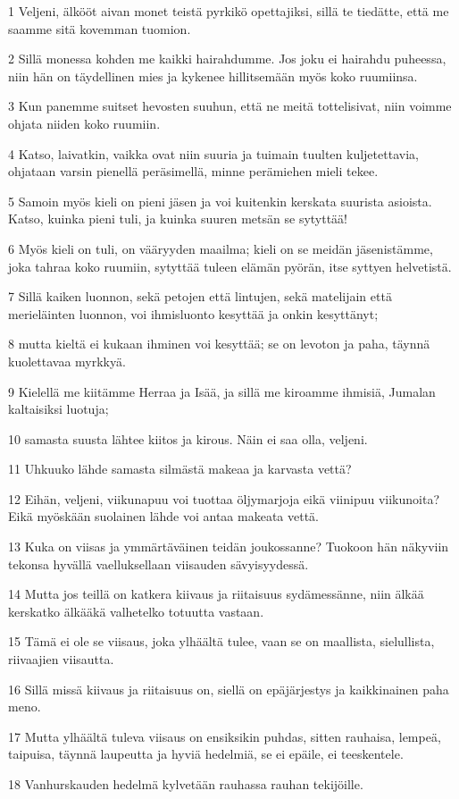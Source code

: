 \par 1 Veljeni, älkööt aivan monet teistä pyrkikö opettajiksi, sillä te tiedätte, että me saamme sitä kovemman tuomion.
\par 2 Sillä monessa kohden me kaikki hairahdumme. Jos joku ei hairahdu puheessa, niin hän on täydellinen mies ja kykenee hillitsemään myös koko ruumiinsa.
\par 3 Kun panemme suitset hevosten suuhun, että ne meitä tottelisivat, niin voimme ohjata niiden koko ruumiin.
\par 4 Katso, laivatkin, vaikka ovat niin suuria ja tuimain tuulten kuljetettavia, ohjataan varsin pienellä peräsimellä, minne perämiehen mieli tekee.
\par 5 Samoin myös kieli on pieni jäsen ja voi kuitenkin kerskata suurista asioista. Katso, kuinka pieni tuli, ja kuinka suuren metsän se sytyttää!
\par 6 Myös kieli on tuli, on vääryyden maailma; kieli on se meidän jäsenistämme, joka tahraa koko ruumiin, sytyttää tuleen elämän pyörän, itse syttyen helvetistä.
\par 7 Sillä kaiken luonnon, sekä petojen että lintujen, sekä matelijain että merieläinten luonnon, voi ihmisluonto kesyttää ja onkin kesyttänyt;
\par 8 mutta kieltä ei kukaan ihminen voi kesyttää; se on levoton ja paha, täynnä kuolettavaa myrkkyä.
\par 9 Kielellä me kiitämme Herraa ja Isää, ja sillä me kiroamme ihmisiä, Jumalan kaltaisiksi luotuja;
\par 10 samasta suusta lähtee kiitos ja kirous. Näin ei saa olla, veljeni.
\par 11 Uhkuuko lähde samasta silmästä makeaa ja karvasta vettä?
\par 12 Eihän, veljeni, viikunapuu voi tuottaa öljymarjoja eikä viinipuu viikunoita? Eikä myöskään suolainen lähde voi antaa makeata vettä.
\par 13 Kuka on viisas ja ymmärtäväinen teidän joukossanne? Tuokoon hän näkyviin tekonsa hyvällä vaelluksellaan viisauden sävyisyydessä.
\par 14 Mutta jos teillä on katkera kiivaus ja riitaisuus sydämessänne, niin älkää kerskatko älkääkä valhetelko totuutta vastaan.
\par 15 Tämä ei ole se viisaus, joka ylhäältä tulee, vaan se on maallista, sielullista, riivaajien viisautta.
\par 16 Sillä missä kiivaus ja riitaisuus on, siellä on epäjärjestys ja kaikkinainen paha meno.
\par 17 Mutta ylhäältä tuleva viisaus on ensiksikin puhdas, sitten rauhaisa, lempeä, taipuisa, täynnä laupeutta ja hyviä hedelmiä, se ei epäile, ei teeskentele.
\par 18 Vanhurskauden hedelmä kylvetään rauhassa rauhan tekijöille.

